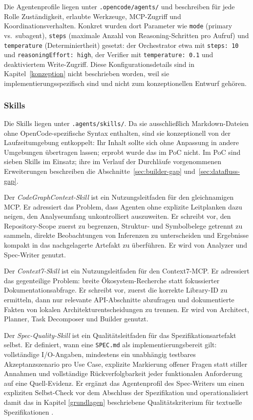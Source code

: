 Die Agentenprofile liegen unter \texttt{.opencode/agents/} und beschreiben für jede Rolle Zuständigkeit, erlaubte Werkzeuge, MCP-Zugriff und Koordinationsverhalten. Konkret wurden dort Parameter wie \texttt{mode} (primary vs.\ subagent), \texttt{steps} (maximale Anzahl von Reasoning-Schritten pro Aufruf) und \texttt{temperature} (Determiniertheit) gesetzt: der Orchestrator etwa mit \texttt{steps: 10} und \texttt{reasoningEffort: high}, der Verifier mit \texttt{temperature: 0.1} und deaktiviertem Write-Zugriff. Diese Konfigurationsdetails sind in Kapitel~\ref{konzeption} nicht beschrieben worden, weil sie implementierungsspezifisch sind und nicht zum konzeptionellen Entwurf gehören.

\subsubsection{Skills}

Die Skills liegen unter \texttt{.agents/skills/}. Da sie ausschließlich Markdown-Dateien ohne OpenCode-spezifische Syntax enthalten, sind sie konzeptionell von der Laufzeitumgebung entkoppelt: Ihr Inhalt sollte sich ohne Anpassung in andere Umgebungen übertragen lassen; erprobt wurde das im PoC nicht. Im PoC sind sieben Skills im Einsatz; ihre im Verlauf der Durchläufe vorgenommenen Erweiterungen beschreiben die Abschnitte~\ref{sec:builder-gap} und~\ref{sec:datafluss-gap}.

Der \emph{CodeGraphContext-Skill} ist ein Nutzungsleitfaden für den gleichnamigen MCP. Er adressiert das Problem, dass Agenten ohne explizite Leitplanken dazu neigen, den Analyseumfang unkontrolliert auszuweiten. Er schreibt vor, den Repository-Scope zuerst zu begrenzen, Struktur- und Symbolbelege getrennt zu sammeln, direkte Beobachtungen von Inferenzen zu unterscheiden und Ergebnisse kompakt in das nachgelagerte Artefakt zu überführen. Er wird von Analyzer und Spec-Writer genutzt.

Der \emph{Context7-Skill} ist ein Nutzungsleitfaden für den Context7-MCP. Er adressiert das gegenteilige Problem: breite Ökosystem-Recherche statt fokussierter Dokumentationsabfrage. Er schreibt vor, zuerst die korrekte Library-ID zu ermitteln, dann nur relevante API-Abschnitte abzufragen und dokumentierte Fakten von lokalen Architekturentscheidungen zu trennen. Er wird von Architect, Planner, Task Decomposer und Builder genutzt.

Der \emph{Spec-Quality-Skill} ist ein Qualitätsleitfaden für das Spezifikationsartefakt selbst. Er definiert, wann eine \texttt{SPEC.md} als implementierungsbereit gilt: vollständige I/O-Angaben, mindestens ein unabhängig testbares Akzeptanzszenario pro Use Case, explizite Markierung offener Fragen statt stiller Annahmen und vollständige Rückverfolgbarkeit jeder funktionalen Anforderung auf eine Quell-Evidenz. Er ergänzt das Agentenprofil des Spec-Writers um einen expliziten Selbst-Check vor dem Abschluss der Spezifikation und operationalisiert damit das in Kapitel \ref{grundlagen} beschriebene Qualitätskriterium für textuelle Spezifikationen \parencite{midolo2026promptguidelines}.

